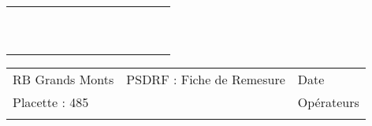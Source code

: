 \documentclass[a4paper, landscape]{article}\usepackage[]{graphicx}\usepackage[]{color}
\begin{document}
{\begin{tabular}{|p{1cm}|p{2cm}|p{1.6cm}|p{1.6cm}|p{1.6cm}|p{1.6cm}|p{1.5cm}|p{1.5cm}|p{1.5cm}|p{1.5cm}|p{1.5cm}|p{7.5cm}|p{5cm}|}
   \rowcolor[gray]{0.95} \hline
 &  &  &  &  &  &  &  &  &  &  &  &  \\ 
   \hline
 &  &  &  &  &  &  &  &  &  &  &  &  \\ 
   \rowcolor[gray]{0.95} \hline
 &  &  &  &  &  &  &  &  &  &  &  &  \\ 
   \hline
 &  &  &  &  &  &  &  &  &  &  &  &  \\ 
   \rowcolor[gray]{0.95} \hline
 &  &  &  &  &  &  &  &  &  &  &  &  \\ 
   \hline
 &  &  &  &  &  &  &  &  &  &  &  &  \\ 
   \rowcolor[gray]{0.95} \hline
 &  &  &  &  &  &  &  &  &  &  &  &  \\ 
   \hline
 &  &  &  &  &  &  &  &  &  &  &  &  \\ 
   \rowcolor[gray]{0.95} \hline
 &  &  &  &  &  &  &  &  &  &  &  &  \\ 
   \hline
 &  &  &  &  &  &  &  &  &  &  &  &  \\ 
   \rowcolor[gray]{0.95} \hline
 &  &  &  &  &  &  &  &  &  &  &  &  \\ 
   \hline
\end{tabular}
}

\begin{tabular}{p{10cm}p{10cm}p{8cm}}
  RB Grands Monts & PSDRF : Fiche de Remesure & Date \\ 
  Placette : 485 &  & Opérateurs \\ 
   &  &  \\ 
  \end{tabular}
\end{document}
